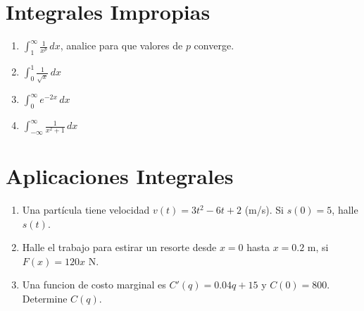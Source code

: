 \documentclass[12pt,a4paper]{article}
\begin{document}
\section{Integrales Impropias}

\begin{enumerate}
    \item $\int_1^{\infty} \frac{1}{x^p}\,dx$, analice para que valores de $p$ converge.
    \item $\int_0^1 \frac{1}{\sqrt{x}}\,dx$
    \item $\int_0^{\infty} e^{-2x}\,dx$
    \item $\int_{-\infty}^{\infty} \frac{1}{x^2+1}\,dx$
\end{enumerate}

\section{Aplicaciones Integrales}

\begin{enumerate}
    \item Una partícula tiene velocidad $v(t)=3t^2-6t+2$ (m/s). Si $s(0)=5$, halle $s(t)$.
    \item Halle el trabajo para estirar un resorte desde $x=0$ hasta $x=0.2$ m, si $F(x)=120x$ N.
    \item Una funcion de costo marginal es $C'(q)=0.04q+15$ y $C(0)=800$. Determine $C(q)$.
\end{enumerate}
\end{document}
